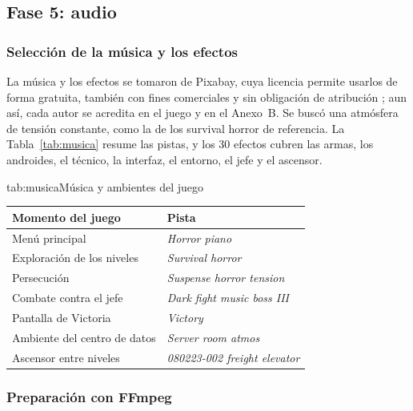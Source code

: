 \subsection{Fase 5: audio}

\subsubsection{Selección de la música y los efectos}

La música y los efectos se tomaron de Pixabay, cuya licencia permite usarlos de forma gratuita,
también con fines comerciales y sin obligación de atribución \parencite{pixabaylicencia}; aun así,
cada autor se acredita en el juego y en el Anexo~B. Se buscó una atmósfera de tensión constante,
como la de los survival horror de referencia. La Tabla~\ref{tab:musica} resume las pistas, y los
30 efectos cubren las armas, los androides, el técnico, la interfaz, el entorno, el jefe y el
ascensor.

\begin{TablaAPA}{tab:musica}{Música y ambientes del juego}
\begin{tabularx}{\linewidth}{P{4.4cm}L}
\toprule
Momento del juego & Pista \\
\midrule
Menú principal & \textit{Horror piano} \parencite{leberch_piano} \\
Exploración de los niveles & \textit{Survival horror} \parencite{leberch_survival} \\
Persecución & \textit{Suspense horror tension} \parencite{delosound_tension} \\
Combate contra el jefe & \textit{Dark fight music boss III} \parencite{montogoronto_boss} \\
Pantalla de Victoria & \textit{Victory} \parencite{paulyudin_victory} \\
Ambiente del centro de datos & \textit{Server room atmos} \parencite{freesound_servidores} \\
Ascensor entre niveles & \textit{080223-002 freight elevator} \parencite{freesound_ascensor} \\
\bottomrule
\end{tabularx}
\end{TablaAPA}

\subsubsection{Preparación con FFmpeg}

